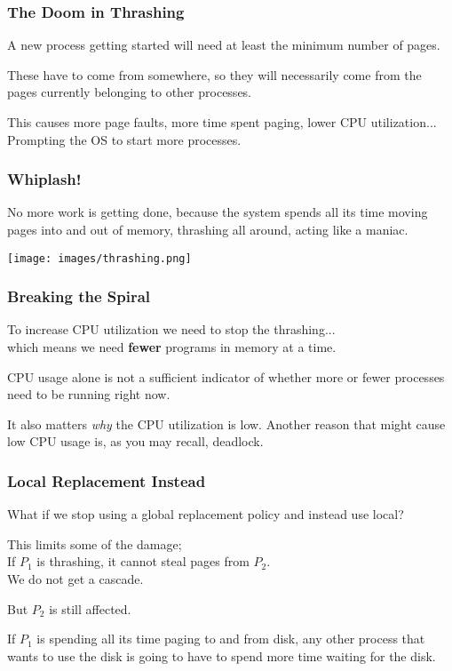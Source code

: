\begin{frame}
\frametitle{The Doom in Thrashing}

A new process getting started will need at least the minimum number of pages. 

These have to come from somewhere, so they will necessarily come from the pages currently belonging to other processes. 

This causes more page faults, more time spent paging, lower CPU utilization...\\
\quad Prompting the OS to start more processes. 
\end{frame}

\begin{frame}
\frametitle{Whiplash!}

No more work is getting done, because the system spends all its time moving pages into and out of memory, thrashing all around, acting like a maniac.

\begin{center}
\texttt{[image: images/thrashing.png]}
\end{center}

\end{frame}

\begin{frame}
\frametitle{Breaking the Spiral}

To increase CPU utilization we need to stop the thrashing...\\
\quad which means we need \textbf{fewer} programs in memory at a time. 

CPU usage alone is not a sufficient indicator of whether more or fewer processes need to be running right now. 

It also matters \textit{why} the CPU utilization is low. Another reason that might cause low CPU usage is, as you may recall, deadlock. 


\end{frame}

\begin{frame}
\frametitle{Local Replacement Instead}

What if we stop using a global replacement policy and instead use local? 

This limits some of the damage;\\
\quad If $P_{1}$ is thrashing, it cannot steal pages from $P_{2}$.\\
\quad We do not get a cascade.

But $P_{2}$ is still affected.

If $P_{1}$ is spending all its time paging to and from disk, any other process that wants to use the disk is going to have to spend more time waiting for the disk.


\end{frame}

